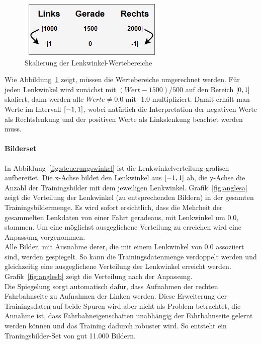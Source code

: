 \begin{figure}[h]
	\centering
	\includegraphics[scale=0.6]{figures/Lenkwinkelskalierung.png}
	\caption{Skalierung der Lenkwinkel-Wertebereiche}
	\label{img:skalierunglenkwinkel}
\end{figure}

Wie Abbildung~\ref{img:skalierunglenkwinkel} zeigt, müssen die Wertebereiche umgerechnet werden. Für jeden Lenkwinkel wird zunächst mit $(Wert-1500)/500$ auf den Bereich $\interval{0}{1}$ skaliert, dann werden alle $Werte\neq0.0$ mit -1.0 multipliziert. Damit erhält man Werte im Intervall $\interval{-1}{1}$, wobei natürlich die Interpretation der negativen Werte als Rechtslenkung und der positiven Werte als Linkslenkung beachtet werden muss.

\paragraph{Bilderset}
In Abbildung~\ref{fig:steuerungswinkel} ist die Lenkwinkelverteilung grafisch aufbereitet. Die x-Achse bildet den Lenkwinkel aus $\interval{-1}{1}$ ab, die y-Achse die Anzahl der Trainingsbilder mit dem jeweiligen Lenkwinkel. Grafik~\ref{fig:anglesa} zeigt die Verteilung der Lenkwinkel (zu entsprechenden Bildern) in der gesamten Trainingsbildermenge. Es wird sofort ersichtlich, dass die Mehrheit der gesammelten Lenkdaten von einer Fahrt geradeaus, mit Lenkwinkel um 0.0, stammen. Um eine möglichst ausgeglichene Verteilung zu erreichen wird eine Anpassung vorgenommen.\\
Alle Bilder, mit Ausnahme derer, die mit einem Lenkwinkel von 0.0 assoziiert sind, werden gespiegelt. So kann die Trainingsdatenmenge verdoppelt werden und gleichzeitig eine ausgeglichene Verteilung der Lenkwinkel erreicht werden. Grafik~\ref{fig:anglesb} zeigt die Verteilung nach der Anpassung.\\
Die Spiegelung sorgt automatisch dafür, dass Aufnahmen der rechten Fahrbahnseite zu Aufnahmen der Linken werden. Diese Erweiterung der Trainingsdaten auf beide Spuren wird aber nicht als Problem betrachtet, die Annahme ist, dass Fahrbahneigenschaften unabhängig der Fahrbahnseite gelernt werden können und das Training dadurch robuster wird. So entsteht ein Traningsbilder-Set von gut 11.000 Bildern.


